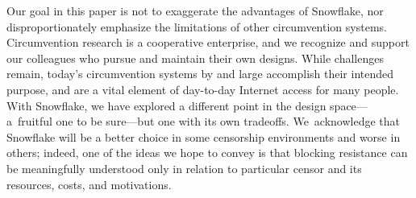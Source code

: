 \documentclass[letterpaper,twocolumn]{article}
\begin{document}
Our goal in this paper
is not to exaggerate the advantages of Snowflake,
nor disproportionately emphasize the limitations
of other circumvention systems.
Circumvention research is a cooperative enterprise,
and we recognize and support our colleagues who
pursue and maintain their own designs.
While challenges remain,
today's circumvention systems by and large
accomplish their intended purpose,
and are a vital element of day-to-day Internet access for many people.
With Snowflake, we have explored a different point in the design space---a~fruitful
one to be sure---but one with its own tradeoffs.
We~acknowledge that Snowflake will be a better choice in some
censorship environments and
worse in others; indeed,
one of the ideas we hope to convey
is that blocking resistance
can be meaningfully understood only in relation to particular censor
and its resources, costs, and motivations.
\end{document}
